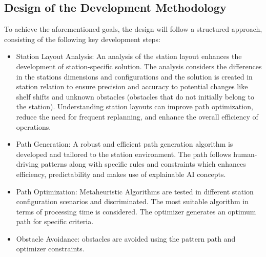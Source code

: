 \subsection{Design of the Development Methodology}
To achieve the aforementioned goals, the design  will follow a structured approach, consisting of the following key 
development steps: 

\begin{itemize}
    \item Station Layout Analysis: An analysis of the station layout enhances the development 
    of station-specific solution. The analysis considers the differences in the stations dimensions
    and configurations and the solution is created in station relation to ensure precision and accuracy
    to potential changes like shelf shifts and unknown obstacles (obstacles that do not initially 
    belong to the station). Understanding station layouts can improve path optimization, reduce the need for 
    frequent replanning, and enhance the overall efficiency of operations.

    \item Path Generation: A robust and efficient path generation algorithm is developed and tailored to 
    the station environment. The path follows human-driving patterns along with specific rules and constraints 
    which enhances efficiency, predictability and makes use of explainable AI concepts.

    \item Path Optimization: Metaheuristic Algorithms are tested in different station configuration scenarios 
    and discriminated. The most suitable algorithm in terms of processing time is considered. The optimizer 
    generates an optimum path for specific criteria. 

    \item Obstacle Avoidance: obstacles are avoided using the pattern path and optimizer constraints.

\end{itemize}

